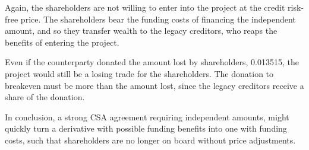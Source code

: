 \documentclass[../main.tex]{subfiles}
\begin{document}
        Again, the shareholders are not willing to enter into the project 
        at the credit risk-free price.
        The shareholders bear the funding costs of financing the independent amount,
        and so they transfer wealth to the legacy creditors, 
        who reaps the benefits of entering the project.
        
        Even if the counterparty donated the amount lost by shareholders, \num{0.013515},
        the project would still be a losing trade for the shareholders.
        The donation to breakeven must be more than the amount lost,
        since the legacy creditors receive a share of the donation. 

        In conclusion, a strong CSA agreement requiring independent amounts, 
        might quickly turn a derivative with possible funding benefits into one with funding costs, 
        such that shareholders are no longer on board without price adjustments.
\end{document}
